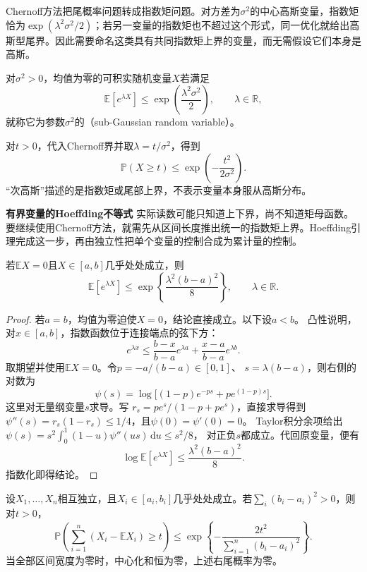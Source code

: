 Chernoff方法把尾概率问题转成指数矩问题。对方差为\(\sigma^2\)的中心高斯变量，指数矩恰为\(\exp(\lambda^2\sigma^2/2)\)；若另一变量的指数矩也不超过这个形式，同一优化就给出高斯型尾界。因此需要命名这类具有共同指数矩上界的变量，而无需假设它们本身是高斯。
\begin{definition}[次高斯变量]
  \label{def:probability-subgaussian}
对\(\sigma^2>0\)，均值为零的可积实随机变量\(X\)若满足
\[ \mathbb{E}[e^{\lambda X}]
  \leq\exp\left(\frac{\lambda^2\sigma^2}{2}\right),\qquad \lambda\in\mathbb{R}, \]
就称它为参数\(\sigma^2\)的（sub-Gaussian random variable）。
\end{definition}
对\(t>0\)，代入Chernoff界并取\(\lambda=t/\sigma^2\)，得到
\[ \mathbb{P}(X\geq t)
  \leq\exp\left(-\frac{t^2}{2\sigma^2}\right). \]
“次高斯”描述的是指数矩或尾部上界，不表示变量本身服从高斯分布。

\par\medskip\noindent\textbf{有界变量的Hoeffding不等式}\quad
实际读数可能只知道上下界，尚不知道矩母函数。要继续使用Chernoff方法，就需先从区间长度推出统一的指数矩上界。Hoeffding引理完成这一步，再由独立性把单个变量的控制合成为累计量的控制。
\begin{lemma}[Hoeffding引理]
\label{lem:probability-hoeffding-lemma}
若\(\mathbb{E}X=0\)且\(X\in[a,b]\)几乎处处成立，则
\[ \mathbb{E}[e^{\lambda X}]
  \leq\exp\left\{\frac{\lambda^2(b-a)^2}{8}\right\},\qquad \lambda\in\mathbb{R}. \]
\end{lemma}

\begin{proof}
若\(a=b\)，均值为零迫使\(X=0\)，结论直接成立。以下设\(a<b\)。
凸性说明，对\(x\in[a,b]\)，指数函数位于连接端点的弦下方：
\[ e^{\lambda x}
  \leq\frac{b-x}{b-a}e^{\lambda a}+\frac{x-a}{b-a}e^{\lambda b}. \]
取期望并使用\(\mathbb{E}X=0\)。令\(p=-a/(b-a)\in[0,1]\)、
\(s=\lambda(b-a)\)，则右侧的对数为
\[
 \psi(s)=\log\bigl[(1-p)e^{-ps}+pe^{(1-p)s}\bigr].
\]
这里对无量纲变量\(s\)求导。写
\(r_s=pe^s/(1-p+pe^s)\)，直接求导得到
\(\psi''(s)=r_s(1-r_s)\leq1/4\)，且\(\psi(0)=\psi'(0)=0\)。
Taylor积分余项给出
\(\psi(s)=s^2\int_0^1(1-u)\psi''(us)\,\mathrm du\leq s^2/8\)，
对正负\(s\)都成立。代回原变量，便有
\[ \log\mathbb{E}[e^{\lambda X}]
  \leq\frac{\lambda^2(b-a)^2}{8}. \]
指数化即得结论。
\end{proof}

\begin{theorem}[Hoeffding不等式]
\label{thm:probability-hoeffding-inequality}
设\(X_1,\ldots,X_n\)相互独立，且\(X_i\in[a_i,b_i]\)几乎处处成立。若\(\sum_i(b_i-a_i)^2>0\)，则对\(t>0\)，
\[
  \mathbb{P}\left(
    \sum_{i=1}^{n}(X_i-\mathbb{E}X_i)\geq t
  \right)
  \leq
  \exp\left\{
    -\frac{2t^2}{\sum_{i=1}^{n}(b_i-a_i)^2}
  \right\}.
\]
当全部区间宽度为零时，中心化和恒为零，上述右尾概率为零。
\end{theorem}

